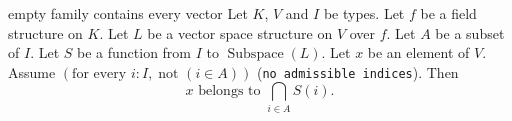 \else
\begin{cleanresult}{empty family contains every vector}
Let $K$, $V$ and $I$ be types.
Let $f$ be a field structure on $K$.
Let $L$ be a vector space structure on $V$ over $f$.
Let $A$ be a subset of $I$.
Let $S$ be a function from $I$ to $\operatorname{Subspace}(L)$.
Let $x$ be an element of $V$.
Assume $\left(\text{for every }i : I,\; \text{not }\left(i\in A\right)\right)$ (\texttt{no admissible indices}).
Then \[x\text{ belongs to }\bigcap_{i \in A} S(i).\]
\par{}
\end{cleanresult}

\fi

